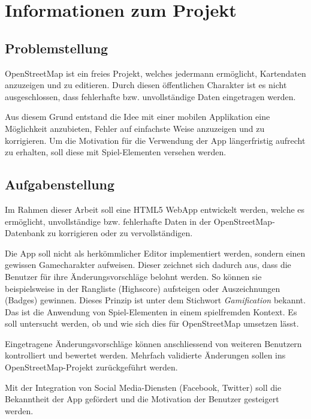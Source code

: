 \chapter{Informationen zum Projekt}
\label{informationen-projekt}


\section{Problemstellung}
\gls{OpenStreetMap} ist ein freies Projekt, welches jedermann ermöglicht, Kartendaten anzuzeigen und zu editieren.
Durch diesen öffentlichen Charakter ist es nicht ausgeschlossen, dass fehlerhafte bzw. unvollständige Daten eingetragen werden.

Aus diesem Grund entstand die Idee mit einer mobilen Applikation eine Möglichkeit anzubieten, Fehler auf einfachste Weise anzuzeigen und zu korrigieren.
Um die Motivation für die Verwendung der App längerfristig aufrecht zu erhalten, soll diese mit Spiel-Elementen versehen werden.

\section{Aufgabenstellung}
Im Rahmen dieser Arbeit soll eine HTML5 \gls{WebApp} entwickelt werden, welche es ermöglicht, unvollständige bzw. fehlerhafte Daten in der \gls{OpenStreetMap}-Datenbank zu korrigieren oder zu vervollständigen.

Die App soll nicht als herkömmlicher Editor implementiert werden, sondern einen gewissen Gamecharakter aufweisen.
Dieser zeichnet sich dadurch aus, dass die Benutzer für ihre Änderungsvorschläge belohnt werden.
So können sie beispielsweise in der Rangliste (Highscore) aufsteigen oder Auszeichnungen (Badges) gewinnen.
Dieses Prinzip ist unter dem Stichwort \emph{Gamification} bekannt.
Das ist die Anwendung von Spiel-Elementen in einem spielfremden Kontext.
Es soll untersucht werden, ob und wie sich dies für \gls{OpenStreetMap} umsetzen lässt.

Eingetragene Änderungsvorschläge können anschliessend von weiteren Benutzern kontrolliert und bewertet werden.
Mehrfach validierte Änderungen sollen ins \gls{OpenStreetMap}-Projekt zurückgeführt werden.

Mit der Integration von Social Media-Diensten (Facebook, Twitter) soll die Bekanntheit der App gefördert und die Motivation der Benutzer gesteigert werden.

